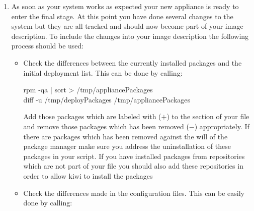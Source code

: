 \begin{enumerate}
\begin{itemize}
            \begin{Command}{10cm}
            rpm -qa | sort > /tmp/deployPackages
            \end{Command}

      \item Check the output of the command  and
            include everything which is unknown to git and surely
            will not be changed by you and will not become part of the
            image description overlay files to the 
            files
      \end{itemize}

      After the initial package list exists and the git repository is
      clean you can start to configure the system. You never should
      install additional software just by installing an unmanaged archive
      or build and install from source. It's very hard to find out
      what binary files had been installed and it's also not architecture
      safe. If there is really no other way for the software to become
      part of the image you should address this issue directly in your
      image description and the config.sh script but not after the initial
      deployment has happened.
\item As soon as your system works as expected your new appliance is
      ready to enter the final stage. At this point you have done several
      changes to the system but they are all tracked and should now become
      part of your image description. To include the changes into your
      image description the following process should be used:
      \begin{itemize}
      \item Check the differences between the currently installed packages
            and the initial deployment list. This can be done by calling:

            \begin{Command}{12cm}
            rpm -qa | sort > /tmp/appliancePackages\\
            diff -u /tmp/deployPackages /tmp/appliancePackages
            \end{Command}

            Add those packages which are labeled with ($+$) to the
             section of your 
            file and remove those packages which has been removed ($-$)
            appropriately. If there are packages which has been removed
            against the will of the package manager make sure you address
            the uninstallation of these packages in your 
            script. If you have installed packages from repositories which
            are not part of your  file you should also add these
            repositories in order to allow kiwi to install the packages
      \item Check the differences made in the configuration files. This
            can be easily done by calling:


\end{itemize}
\end{enumerate}
